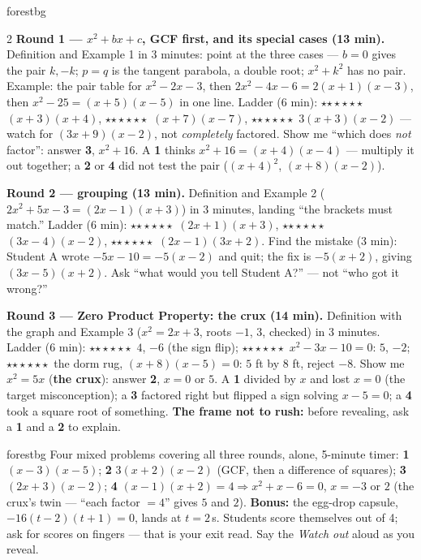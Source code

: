 \documentclass[10pt]{article}
\newcommand{\rung}[1]{{\color{goldacc}\ifcase#1\or$\star$\or$\star\star$\or$\star\star\star$\fi}}
\begin{document}
\begin{skillbox}{forestbg}
\begin{multicols}{2}
\textbf{Round 1 --- $x^2+bx+c$, GCF first, and its special cases (13 min).} Definition and
Example 1 in 3 minutes: point at the three cases --- $b=0$ gives the pair $k,-k$; $p=q$ is the
tangent parabola, a double root; $x^2+k^2$ has no pair. Example: the pair table for
$x^2-2x-3$, then $2x^2-4x-6=2(x+1)(x-3)$, then $x^2-25=(x+5)(x-5)$ in one line. Ladder (6 min):
\rung1\ $(x+3)(x+4)$, \rung2\ $(x+7)(x-7)$, \rung3\ $3(x+3)(x-2)$ --- watch for $(3x+9)(x-2)$,
not \emph{completely} factored. Show me ``which does \emph{not} factor'': answer \textbf{3},
$x^2+16$. A \textbf{1} thinks $x^2+16=(x+4)(x-4)$ --- multiply it out together; a \textbf{2} or
\textbf{4} did not test the pair ($(x+4)^2$, $(x+8)(x-2)$).

\textbf{Round 2 --- grouping (13 min).} Definition and Example 2 ($2x^2+5x-3=(2x-1)(x+3)$) in 3
minutes, landing ``the brackets must match.'' Ladder (6 min): \rung1\ $(2x+1)(x+3)$,
\rung2\ $(3x-4)(x-2)$, \rung3\ $(2x-1)(3x+2)$. Find the mistake (3 min): Student A wrote
$-5x-10=-5(x-2)$ and quit; the fix is $-5(x+2)$, giving $(3x-5)(x+2)$. Ask ``what would you
tell Student A?'' --- not ``who got it wrong?''

\columnbreak
\textbf{Round 3 --- Zero Product Property: the crux (14 min).} Definition with the graph and
Example 3 ($x^2=2x+3$, roots $-1$, $3$, checked) in 3 minutes. Ladder (6 min):
\rung1\ $4$, $-6$ (the sign flip); \rung2\ $x^2-3x-10=0$: $5$, $-2$; \rung3\ the dorm rug,
$(x+8)(x-5)=0$: $5$ ft by $8$ ft, reject $-8$. Show me $x^2=5x$ (\textbf{the crux}): answer
\textbf{2}, $x=0$ or $5$. A \textbf{1} divided by $x$ and lost $x=0$ (the target misconception);
a \textbf{3} factored right but flipped a sign solving $x-5=0$; a \textbf{4} took a square root
of something. \textbf{The frame not to rush:} before revealing, ask a \textbf{1} and a
\textbf{2} to explain.
\end{multicols}
\end{skillbox}

\boxguard
\begin{skillbox}{forestbg}
Four mixed problems covering all three rounds, alone, 5-minute timer: \textbf{1} $(x-3)(x-5)$;
\textbf{2} $3(x+2)(x-2)$ (GCF, then a difference of squares); \textbf{3} $(2x+3)(x-2)$;
\textbf{4} $(x-1)(x+2)=4\Rightarrow x^2+x-6=0$, $x=-3$ or $2$ (the crux's twin --- ``each factor
$=4$'' gives $5$ and $2$). \textbf{Bonus:} the egg-drop capsule, $-16(t-2)(t+1)=0$, lands at
$t=2$\,s. Students score themselves out of 4; ask for scores on fingers --- that is your exit
read. Say the \emph{Watch out} aloud as you reveal.
\end{skillbox}
\end{document}
